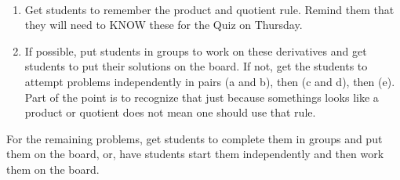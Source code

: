 \documentclass[11pt,fleqn]{article}
\begin{document}
\renewcommand{\headrulewidth}{0pt}
\newcommand{\blank}[1]{\rule{#1}{0.75pt}}
\newcommand{\bc}{\begin{center}}
\newcommand{\ec}{\end{center}}
\renewcommand{\d}{\displaystyle}

\vspace*{-0.7in}

\begin{center}
  \large
  \\
\end{center}
\begin{enumerate}
\item Get students to remember the product and quotient rule. Remind them that they will need to KNOW these for the Quiz on Thursday.
\item If possible, put students in groups to work on these derivatives and get students to put their solutions on the board. If not, get the students to attempt problems independently in pairs (a and b), then (c and d), then (e). Part of the point is to recognize that just because somethings looks like a product or quotient does not mean one should use that rule.

\end{enumerate}

For the remaining problems, get students to complete them in groups and put them on the board, or, have students start them independently and then work them on the board.
\end{document}

